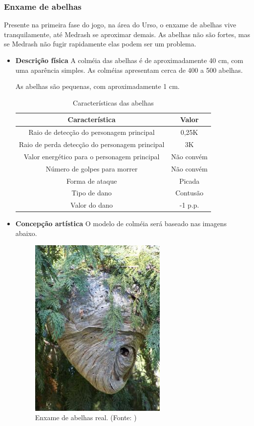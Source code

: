\subsubsection{Enxame de abelhas}
Presente na primeira fase do jogo, na área do Urso, o enxame de abelhas vive tranquilamente, até Medrash se aproximar demais. As abelhas não são fortes, mas se Medrash não fugir rapidamente elas podem ser um problema.
\begin{itemize}
\item {\bf Descrição física}
A colméia das abelhas é de aproximadamente 40 cm, com uma aparência simples. As colméias apresentam cerca de 400 a 500 abelhas.

As abelhas são pequenas, com aproximadamente 1 cm. 
\begin{table}[H]
\begin{center}
\begin{tabular}{|c|c|}
\hline 
\textbf{Característica} & \textbf{Valor} \\ 
\hline 
Raio de detecção do personagem principal & 0,25K \\ 
\hline 
Raio de perda detecção do personagem principal & 3K \\ 
\hline 
Valor energético para o personagem principal & Não convém\\ 
\hline 
Número de golpes para morrer & Não convém \\ 
\hline 
Forma de ataque & Picada \\ 
\hline 
Tipo de dano & Contusão \\ 
\hline 
Valor do dano & -1 p.p. \\ 
\hline 
\end{tabular} 
\end{center}
\caption{Características das abelhas}
\label{table:abelhas}
\end{table}
\end{itemize}
\begin{itemize}

\item {\bf Concepção artística}
O modelo de colméia será baseado nas imagens abaixo.

 \begin{figure}[H]
 \centering
 \includegraphics[scale=0.7]{Imagens/enxame01.png}
 \caption{Enxame de abelhas real. (Fonte: \cite{bib:enxame01})}
\label{img:abelhas}
\end{figure}
\end{itemize}
\newpage
